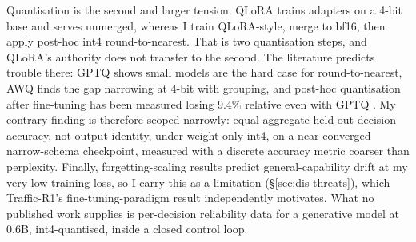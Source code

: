 Quantisation is the second and larger tension. QLoRA trains adapters on a 4-bit base and serves unmerged, whereas I train QLoRA-style, merge to bf16, then apply post-hoc int4 round-to-nearest. That is two quantisation steps, and QLoRA's authority does not transfer to the second. The literature predicts trouble there: GPTQ \cite{frantar2022gptq} shows small models are the hard case for round-to-nearest, AWQ \cite{lin2023awq} finds the gap narrowing at 4-bit with grouping, and post-hoc quantisation after fine-tuning has been measured losing 9.4\% relative even with GPTQ \cite{quantlora2024}. My contrary finding is therefore scoped narrowly: equal aggregate held-out decision accuracy, not output identity, under weight-only int4, on a near-converged narrow-schema checkpoint, measured with a discrete accuracy metric coarser than perplexity. Finally, forgetting-scaling results \cite{forgetting2024} predict general-capability drift at my very low training loss, so I carry this as a limitation (\S\ref{sec:dis-threats}), which Traffic-R1's fine-tuning-paradigm result independently motivates. What no published work supplies is per-decision reliability data for a generative model at 0.6B, int4-quantised, inside a closed control loop.
